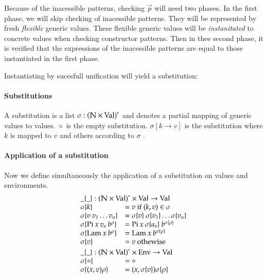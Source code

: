 Because of the inacessible patterns, checking $\vec{p}$ will need two phases.
In the first phase, we will skip checking of inacessible patterns.
They will be represented by fresh \emph{flexible} generic values.
These flexible generic values will be \emph{instanitated} to concrete values when checking constructor patterns.
Then in thee second phase, it is verified that the expressions of the inacessible patterns are equal to those instantiated in the first phase.
\newcommand{\subst}[2]{#1\{#2\}}
\newcommand{\substEnv}[2]{#1\{#2\}}
\newcommand{\compS}[2]{\mathrm{comp}\:#1\:#2}
\newcommand\ptv[2]{#1\Searrow#2}
\newcommand\ptvx{\mathrm{p2v}}
\newcommand\pstvs{\mathrm{p_{s}2v_{s}}}

Instantiating by sucesfull unification will yield a substitution:
\paragraph*{Substitutions}
A substitution is a list $\sigma : {(\mathbb{N} \times \mathrm{Val})}^{\ast} $ and denotes a partial mapping of generic values to values.
$\diamond$ is the empty substitution.
$\sigma[k \rightarrow v] $ is the substitution where $k$ is mapped to $v$ and others according to $\sigma$ .

\paragraph*{Application of a substitution}
Now we define simultaneously the application of a substitution on values and environments.
\[
\begin{array}{ll}
\multicolumn{2}{l}{\subst{\_}{\_} : \ves{(\cN \times \Val)} \times \Val \ra \Val} \\
\subst{\sigma}{k} & = v \mbox{ if } (k,v) \in \sigma \\
\subst{\sigma}{v \: v_1 \ldots v_n} & = \subst{\sigma}{v} \: \subst{\sigma}{v_1} \ldots \subst{\sigma}{v_n}\\
\subst{\sigma}{\vpi \: x \: v_a \: \cl{b}{\rho}} & = \vpi \: x \: \subst{\sigma}{a_v} \: \cl{b}{\subst{\sigma}{\rho}} \\
\subst{\sigma}{\vlam \: x \: \cl{b}{\rho}} & = \vlam \: x \: \cl{b}{\subst{\sigma}{\rho}} \\
\subst{\sigma}{v} & = v \mbox{ othewise }
\vs\\
\multicolumn{2}{l}{\substEnv{\_}{\_} : \ves{(\cN \times \Val)} \times \Env \ra \Val} \\
\substEnv{\sigma}{\diamond} & = \diamond \\
\substEnv{\sigma}{(x,v)\rho} & = (x,\subst{\sigma}{v}) \substEnv{\sigma}{\rho} \\
\end{array}
\]

